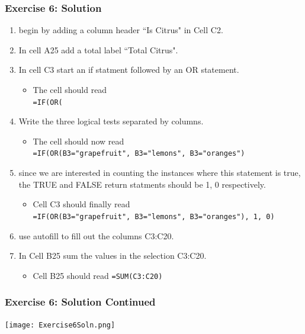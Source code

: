 \documentclass[12pt]{beamer}
\begin{document}
\begin{frame}
	\frametitle{Exercise 6: Solution}
	\begin{enumerate}
		\item begin by adding a column header ``Is Citrus" in Cell C2.
		\item In cell A25 add a total label ``Total Citrus".
		\item In cell C3 start an if statment followed by an OR statement.
			\begin{itemize}
				\item The cell should read \\
				\texttt{=IF(OR(}
			\end{itemize}
		\item Write the three logical tests separated by columns.
			\begin{itemize}
				\item The cell should now read \\
				\texttt{=IF(OR(B3="grapefruit", B3="lemons", B3="oranges")}
			\end{itemize}
		\item since we are interested in counting the instances where this statement is true, the TRUE and FALSE return statments should be 1, 0 respectively.
			\begin{itemize}
				\item Cell C3 should finally read \\
				\texttt{=IF(OR(B3="grapefruit", B3="lemons", B3="oranges"), 1, 0)}
			\end{itemize}
	\item use autofill to fill out the columns C3:C20.
	\item In Cell B25 sum the values in the selection C3:C20.
		\begin{itemize}
			\item Cell B25 should read \texttt{=SUM(C3:C20)}
		\end{itemize}
	\end{enumerate}
\end{frame}
\begin{frame}
	\frametitle{Exercise 6: Solution Continued}
	\begin{center}
		\texttt{[image: Exercise6Soln.png]}
	\end{center}
\end{frame}
\end{document}
